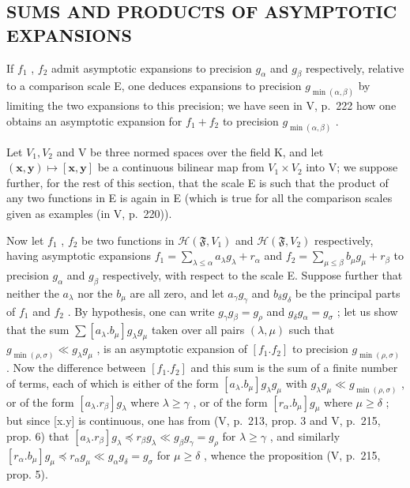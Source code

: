 \subsection{SUMS AND PRODUCTS OF ASYMPTOTIC EXPANSIONS}

If \(f_{1}\) , \(f_{2}\) admit asymptotic expansions to precision \(g_{\alpha}\) and \(g_{\beta}\) respectively, relative to a comparison scale E, one deduces expansions to precision \(g_{\min(\alpha,\beta)}\) by limiting the two expansions to this precision; we have seen in V, p.~222 how one obtains an asymptotic expansion for \(f_{1} + f_{2}\) to precision \(g_{\min(\alpha,\beta)}\) .

Let \(V_{1}, V_{2}\) and V be three normed spaces over the field K, and let \((\mathbf{x}, \mathbf{y}) \mapsto [\mathbf{x}, \mathbf{y}]\) be a continuous bilinear map from \(V_{1} \times V_{2}\) into V; we suppose further, for the rest of this section, that the scale E is such that the product of any two functions in E is again in E (which is true for all the comparison scales given as examples (in V, p.~220)).

Now let \(f_{1}\) , \(f_{2}\) be two functions in \(\mathcal{H}(\mathfrak{F}, V_{1})\) and \(\mathcal{H}(\mathfrak{F}, V_{2})\) respectively, having asymptotic expansions \(f_{1} = \sum_{\lambda \leqslant \alpha} a_{\lambda} g_{\lambda} + r_{\alpha}\) and \(f_{2} = \sum_{\mu \leqslant \beta} b_{\mu} g_{\mu} + r_{\beta}\) to precision \(g_{\alpha}\) and \(g_{\beta}\) respectively, with respect to the scale E. Suppose further that neither the \(a_{\lambda}\) nor the \(b_{\mu}\) are all zero, and let \(a_{\gamma} g_{\gamma}\) and \(b_{\delta} g_{\delta}\) be the principal parts of \(f_{1}\) and \(f_{2}\) . By hypothesis, one can write \(g_{\gamma} g_{\beta} = g_{\rho}\) and \(g_{\delta} g_{\alpha} = g_{\sigma}\) ; let us show that the sum \(\sum[a_{\lambda}.b_{\mu}]g_{\lambda}g_{\mu}\) taken over all pairs \((\lambda,\mu)\) such that \(g_{\min(\rho,\sigma)}\ll g_{\lambda}g_{\mu}\) , is an asymptotic expansion of \([f_{1}.f_{2}]\) to precision \(g_{\min(\rho,\sigma)}\) . Now the difference between \([f_{1}.f_{2}]\) and this sum is the sum of a finite number of terms, each of which is either of the form \([a_{\lambda}.b_{\mu}]g_{\lambda}g_{\mu}\) with \(g_{\lambda}g_{\mu}\ll g_{\min(\rho,\sigma)}\) , or of the form \([a_{\lambda}.r_{\beta}]g_{\lambda}\) where \(\lambda\geqslant\gamma\) , or of the form \([r_{\alpha}.b_{\mu}]g_{\mu}\) where \(\mu\geqslant\delta\) ; but since {[}x.y{]} is continuous, one has from (V, p.~213, prop. 3 and V, p.~215, prop. 6) that \([a_{\lambda}.r_{\beta}]g_{\lambda}\preccurlyeq r_{\beta}g_{\lambda}\ll g_{\beta}g_{\gamma}=g_{\rho}\) for \(\lambda\geqslant\gamma\) , and similarly \([r_{\alpha}.b_{\mu}]g_{\mu}\preccurlyeq r_{\alpha}g_{\mu}\ll g_{\alpha}g_{\delta}=g_{\sigma}\) for \(\mu\geqslant\delta\) , whence the proposition (V, p.~215, prop. 5).

